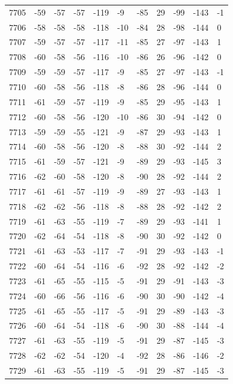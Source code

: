 \begin{table}[H]
\begin{tabular}{lllllllllll}
7705 & -59 & -57 & -57 & -119 & -9 & -85 & 29 & -99 & -143 & -1 \\
7706 & -58 & -58 & -58 & -118 & -10 & -84 & 28 & -98 & -144 & 0 \\
7707 & -59 & -57 & -57 & -117 & -11 & -85 & 27 & -97 & -143 & 1 \\
7708 & -60 & -58 & -56 & -116 & -10 & -86 & 26 & -96 & -142 & 0 \\
7709 & -59 & -59 & -57 & -117 & -9 & -85 & 27 & -97 & -143 & -1 \\
7710 & -60 & -58 & -56 & -118 & -8 & -86 & 28 & -96 & -144 & 0 \\
7711 & -61 & -59 & -57 & -119 & -9 & -85 & 29 & -95 & -143 & 1 \\
7712 & -60 & -58 & -56 & -120 & -10 & -86 & 30 & -94 & -142 & 0 \\
7713 & -59 & -59 & -55 & -121 & -9 & -87 & 29 & -93 & -143 & 1 \\
7714 & -60 & -58 & -56 & -120 & -8 & -88 & 30 & -92 & -144 & 2 \\
7715 & -61 & -59 & -57 & -121 & -9 & -89 & 29 & -93 & -145 & 3 \\
7716 & -62 & -60 & -58 & -120 & -8 & -90 & 28 & -92 & -144 & 2 \\
7717 & -61 & -61 & -57 & -119 & -9 & -89 & 27 & -93 & -143 & 1 \\
7718 & -62 & -62 & -56 & -118 & -8 & -88 & 28 & -92 & -142 & 2 \\
7719 & -61 & -63 & -55 & -119 & -7 & -89 & 29 & -93 & -141 & 1 \\
7720 & -62 & -64 & -54 & -118 & -8 & -90 & 30 & -92 & -142 & 0 \\
7721 & -61 & -63 & -53 & -117 & -7 & -91 & 29 & -93 & -143 & -1 \\
7722 & -60 & -64 & -54 & -116 & -6 & -92 & 28 & -92 & -142 & -2 \\
7723 & -61 & -65 & -55 & -115 & -5 & -91 & 29 & -91 & -143 & -3 \\
7724 & -60 & -66 & -56 & -116 & -6 & -90 & 30 & -90 & -142 & -4 \\
7725 & -61 & -65 & -55 & -117 & -5 & -91 & 29 & -89 & -143 & -3 \\
7726 & -60 & -64 & -54 & -118 & -6 & -90 & 30 & -88 & -144 & -4 \\
7727 & -61 & -63 & -55 & -119 & -5 & -91 & 29 & -87 & -145 & -3 \\
7728 & -62 & -62 & -54 & -120 & -4 & -92 & 28 & -86 & -146 & -2 \\
7729 & -61 & -63 & -55 & -119 & -5 & -91 & 29 & -87 & -145 & -3 \\

\end{tabular}
\end{table}
